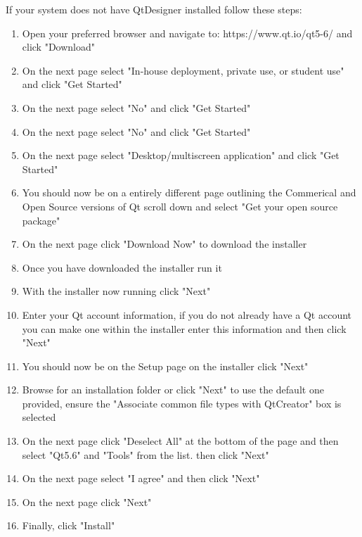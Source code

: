 If your system does not have QtDesigner installed follow these steps:
\begin{enumerate}
	\item Open your preferred browser and navigate to: https://www.qt.io/qt5-6/ and click "Download"
	\item On the next page select "In-house deployment, private use, or student use" and click "Get Started"
	\item On the next page select "No" and click "Get Started"
	\item On the next page select "No" and click "Get Started"
	\item On the next page select "Desktop/multiscreen application" and click "Get Started"
	\item You should now be on a entirely different page outlining the Commerical and Open Source versions of Qt scroll down and select "Get your open source package"
	\item On the next page click "Download Now" to download the installer
	\item Once you have downloaded the installer run it
	\item With the installer now running click "Next"
	\item Enter your Qt account information, if you do not already have a Qt account you can make one within the installer enter this information and then click "Next"
	\item You should now be on the Setup page on the installer click "Next"
	\item Browse for an installation folder or click "Next" to use the default one provided, ensure the "Associate common file types with QtCreator" box is selected 
	\item On the next page click "Deselect All" at the bottom of the page and then select "Qt5.6" and "Tools" from the list. then click "Next"
	\item On the next page select "I agree" and then click "Next"
	\item On the next page click "Next"
	\item Finally, click "Install"
\end{enumerate}